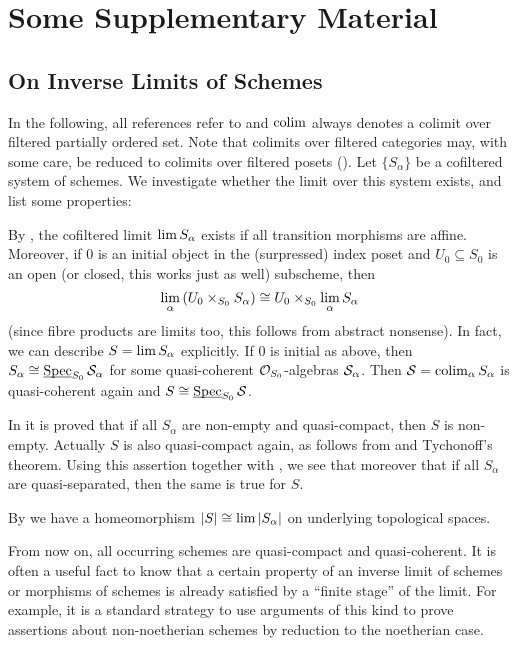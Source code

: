 \chapter{Some Supplementary Material}

\section{On Inverse Limits of Schemes}\label{sec:inverseLimits}
In the following, all references refer to \cite{stacks-project} and $\operatorname*{colim}$ always denotes a colimit over filtered partially ordered set. Note that colimits over filtered categories may, with some care, be reduced to colimits over filtered posets ().
\numpar{}\label{par:schemesInverseLimit}Let $\{S_\alpha\}$ be a cofiltered system of schemes. We investigate whether the limit over this system exists, and list some properties:
\begin{alphanumerate}
	\item By , the cofiltered limit $\operatorname*{lim} S_\alpha$ exists if all transition morphisms are affine. Moreover, if $0$ is an initial object in the (surpressed) index poset and $U_0\subseteq S_0$ is an open (or closed, this works just as well) subscheme, then
	\begin{equation*}
	\operatorname*{lim}_\alpha \left(U_0\times_{S_0}S_\alpha\right)\cong U_0\times_{S_0}\operatorname*{lim}_\alpha S_\alpha
	\end{equation*}
	(since fibre products are limits too, this follows from abstract nonsense). In fact, we can describe $S=\operatorname*{lim} S_\alpha$ explicitly. If $0$ is initial as above, then $S_\alpha\cong \operatorname{\underline{\smash{\mathrm{Spec}}}}_{S_0}\mathcal{S}_\alpha$ for some quasi-coherent $\mathcal{O}_{S_0}$-algebras $\mathcal{S}_\alpha$. Then $\mathcal{S}=\operatorname*{colim}_\alpha S_\alpha$ is quasi-coherent again and $S\cong \operatorname{\underline{\smash{\mathrm{Spec}}}}_{S_0}\mathcal{S}$.
	\item In  it is proved that if all $S_\alpha$ are non-empty and quasi-compact, then $S$ is non-empty. Actually $S$ is also quasi-compact again, as follows from  and Tychonoff's theorem. Using this assertion together with , we see that moreover that if all $S_\alpha$ are quasi-separated, then the same is true for $S$.
	\item By  we have a homeomorphism $|S|\cong \operatorname*{lim} |S_\alpha|$ on underlying topological spaces.
\end{alphanumerate}
\numpar{}\label{par:descendingFinPres} From now on, all occurring schemes are quasi-compact and quasi-coherent. It is often a useful fact to know that a certain property of an inverse limit of schemes or morphisms of schemes is already satisfied by a \enquote{finite stage} of the limit. For example, it is a standard strategy to use arguments of this kind to prove assertions about non-noetherian schemes by reduction to the noetherian case.
